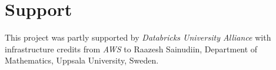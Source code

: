 \chapter{Support} \label{ch:Support}
This project was partly supported by {\em Databricks University Alliance} with infrastructure credits from {\em AWS} to Raazesh Sainudiin, Department of Mathematics, Uppsala University, Sweden. 